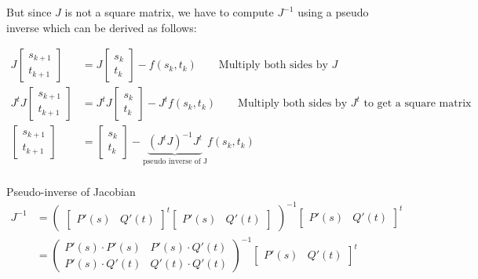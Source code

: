 \documentclass[11pt]{article}
\begin{document}
But since $J$ is not a square matrix, we have to compute $J^{-1}$ using a pseudo inverse
which can be derived as follows:

\begin{align*}
  J
  \begin{bmatrix}
    s_{k+1} \\t_{k+1}
  \end{bmatrix}
   & =
  J
  \begin{bmatrix}
    s_{k} \\t_{k}
  \end{bmatrix}
  -
  f(s_k, t_k)                                                        \qquad\text{Multiply both sides by $J$} \\
  J^t
  J
  \begin{bmatrix}
    s_{k+1} \\t_{k+1}
  \end{bmatrix}
   & =
  J^t
  J
  \begin{bmatrix}
    s_{k} \\t_{k}
  \end{bmatrix}
  -
  J^t
  f(s_k, t_k)         \qquad\text{Multiply both sides by $J^t$ to get a square matrix}                       \\
  \begin{bmatrix}
    s_{k+1} \\t_{k+1}
  \end{bmatrix}
   & =
  \begin{bmatrix}
    s_{k} \\t_{k}
  \end{bmatrix}
  -
  \underbrace{(J^tJ)^{-1}J^t}_\text{pseudo inverse of J} f(s_k, t_k)                                         \\
\end{align*}

Pseudo-inverse of Jacobian
\begin{align*}
  J^{-1} & =
  \begin{pmatrix}
    \begin{bmatrix}
      P'(s) & Q'(t)
    \end{bmatrix}^t
    \begin{bmatrix}
      P'(s) & Q'(t)
    \end{bmatrix}
  \end{pmatrix}^{-1}
  \begin{bmatrix}
    P'(s) & Q'(t)
  \end{bmatrix}^t
  \\
         & =
  \begin{pmatrix}
    P'(s) \cdot P'(s) & P'(s) \cdot Q'(t) \\
    P'(s) \cdot Q'(t) & Q'(t) \cdot Q'(t)
  \end{pmatrix}^{-1}
  \begin{bmatrix}
    P'(s) & Q'(t)
  \end{bmatrix}^t
\end{align*}
\end{document}
